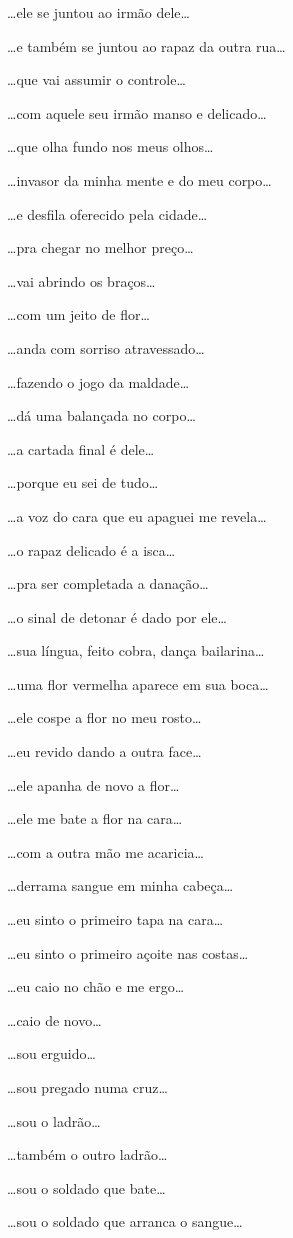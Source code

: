 …ele se juntou ao irmão dele…

…e também se juntou ao rapaz da outra rua…

…que vai assumir o controle…

…com aquele seu irmão manso e delicado…

…que olha fundo nos meus olhos…

…invasor da minha mente e do meu corpo…

…e desfila oferecido pela cidade…

…pra chegar no melhor preço…

…vai abrindo os braços…

…com um jeito de flor…

…anda com sorriso atravessado…

…fazendo o jogo da maldade…

…dá uma balançada no corpo…

…a cartada final é dele…

…porque eu sei de tudo…

…a voz do cara que eu apaguei me revela…

…o rapaz delicado é a isca…

…pra ser completada a danação…

…o sinal de detonar é dado por ele…

…sua língua, feito cobra, dança bailarina…

…uma flor vermelha aparece em sua boca…

…ele cospe a flor no meu rosto…

…eu revido dando a outra face…

…ele apanha de novo a flor…

…ele me bate a flor na cara…

…com a outra mão me acaricia…

…derrama sangue em minha cabeça…

…eu sinto o primeiro tapa na cara…

…eu sinto o primeiro açoite nas costas…

…eu caio no chão e me ergo…

…caio de novo…

…sou erguido…

…sou pregado numa cruz…

…sou o ladrão…

…também o outro ladrão…

…sou o soldado que bate…

…sou o soldado que arranca o sangue…

